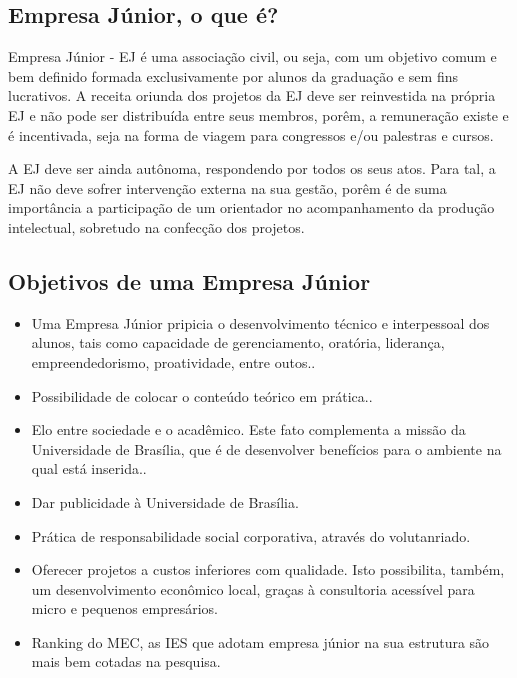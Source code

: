\subsection{Empresa Júnior, o que é?} %
\label{sub:oQueE}

Empresa Júnior - EJ é uma associação civil, ou seja, com um objetivo comum e bem definido formada exclusivamente por alunos da graduação e sem fins lucrativos. A receita oriunda dos projetos da EJ deve ser reinvestida na própria EJ e não pode ser distribuída entre seus membros, porêm, a remuneração existe e é incentivada, seja na forma de viagem para congressos e/ou palestras e cursos.

A EJ deve ser ainda autônoma, respondendo por todos os seus atos. Para tal, a EJ não deve sofrer intervenção externa na sua gestão, porêm é de suma importância a participação de um orientador no acompanhamento da produção intelectual, sobretudo na confecção dos projetos.


\subsection{Objetivos de uma Empresa Júnior} %
\label{sub:objetivos}

\begin{itemize}
	\item Uma Empresa Júnior pripicia o desenvolvimento técnico e interpessoal dos alunos, tais como capacidade de gerenciamento, oratória, liderança, empreendedorismo, proatividade, entre outos.\er.
	\item Possibilidade de colocar o conteúdo teórico em prática.\er.
	\item Elo entre sociedade e o acadêmico. Este fato complementa a missão da Universidade de Brasília, que é de desenvolver benefícios para o ambiente na qual está inserida.\er.
	\item Dar publicidade à Universidade de Brasília.
	\item Prática de responsabilidade social corporativa, através do volutanriado.
	\item Oferecer 	projetos a custos inferiores com qualidade. Isto possibilita, também, um desenvolvimento econômico local, graças à consultoria acessível para micro e pequenos empresários.
	\item Ranking do MEC, as IES que adotam empresa júnior na sua estrutura são mais bem cotadas na pesquisa.
\end{itemize}

